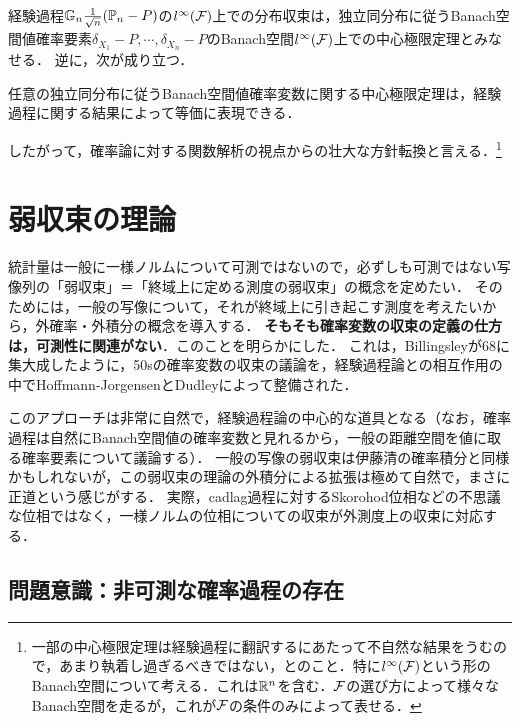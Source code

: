 \documentclass[uplatex,dvipdfmx]{jsreport}
\begin{document}
\begin{discussion}[中心極限定理の翻訳]
    経験過程$\mathbb{G}_n\frac{1}{\sqrt{n}}(\mathbb{P}_n-P)$の$l^\infty(\mathcal{F})$上での分布収束は，独立同分布に従うBanach空間値確率要素$\delta_{X_1}-P,\cdots,\delta_{X_n}-P$のBanach空間$l^\infty(\mathcal{F})$上での中心極限定理とみなせる．
    逆に，次が成り立つ．
    \begin{proposition}
        任意の独立同分布に従うBanach空間値確率変数に関する中心極限定理は，経験過程に関する結果によって等価に表現できる．
    \end{proposition}
    したがって，確率論に対する関数解析の視点からの壮大な方針転換と言える．\footnote{一部の中心極限定理は経験過程に翻訳するにあたって不自然な結果をうむので，あまり執着し過ぎるべきではない，とのこと．特に$l^\infty(\mathcal{F})$という形のBanach空間について考える．これは$\mathbb{R}^n$を含む．$\mathcal{F}$の選び方によって様々なBanach空間を走るが，これが$\mathcal{F}$の条件のみによって表せる．}
\end{discussion}


\section{弱収束の理論}

\begin{tcolorbox}[colframe=ForestGreen, colback=ForestGreen!10!white,breakable,colbacktitle=ForestGreen!40!white,coltitle=black,fonttitle=\bfseries\sffamily,
title=]
    統計量は一般に一様ノルムについて可測ではないので，必ずしも可測ではない写像列の「弱収束」＝「終域上に定める測度の弱収束」の概念を定めたい．
    そのためには，一般の写像について，それが終域上に引き起こす測度を考えたいから，外確率・外積分の概念を導入する．
    \textbf{そもそも確率変数の収束の定義の仕方は，可測性に関連がない}．このことを明らかにした．
    これは，Billingsleyが68に集大成したように，50sの確率変数の収束の議論を，経験過程論との相互作用の中でHoffmann-JorgensenとDudleyによって整備された．

    このアプローチは非常に自然で，経験過程論の中心的な道具となる（なお，確率過程は自然にBanach空間値の確率変数と見れるから，一般の距離空間を値に取る確率要素について議論する）．
    一般の写像の弱収束は伊藤清の確率積分と同様かもしれないが，この弱収束の理論の外積分による拡張は極めて自然で，まさに正道という感じがする．
    実際，cadlag過程に対するSkorohod位相などの不思議な位相ではなく，一様ノルムの位相についての収束が外測度上の収束に対応する．
\end{tcolorbox}

\subsection{問題意識：非可測な確率過程の存在}
\end{document}
